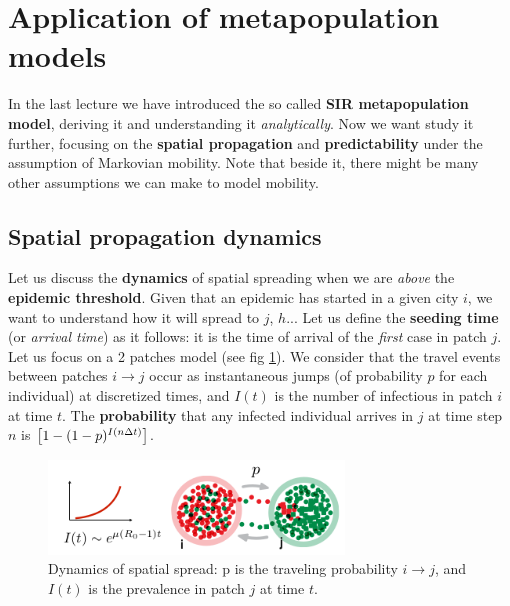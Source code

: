 \documentclass[../main/main.tex]{subfiles}
\begin{document}

\section{Application of metapopulation models}

In the last lecture we have introduced the so called \textbf{SIR metapopulation model}, deriving it and understanding it \textit{analytically}. Now we want study it further, focusing on the \textbf{spatial propagation} and \textbf{predictability} under the assumption of Markovian mobility. Note that beside it, there might be many other assumptions we can make to model mobility.

\subsection{Spatial propagation dynamics}

Let us discuss the \textbf{dynamics} of spatial spreading when we are \textit{above} the \textbf{epidemic threshold}. Given that an epidemic has started in a given city $i$, we want to understand how it will spread to $j$, $h$... Let us define the \textbf{seeding time} (or \textit{arrival time}) as it follows: it is the time of arrival of the \textit{first} case in patch $j$. Let us focus on a 2 patches model (see fig \ref{fig:14_01}). We consider that the travel events between patches $i \to j$ occur as instantaneous jumps (of probability $p$ for each individual) at discretized times, and $I(t)$ is the number of infectious in patch $i$ at time $t$. The \textbf{probability} that any infected individual arrives in $j$ at time step $n$ is \( \qty[1-(1-p)^{I(n \Delta t)}] \).

\begin{figure}[h!]
\centering
\includegraphics[width=0.7\textwidth]{../lessons/image/15/image01.png}
\caption{\label{fig:14_01} Dynamics of spatial spread: p is the traveling probability $i \to j$, and $I(t)$ is the prevalence in patch $j$ at time $t$.}
\end{figure}
\end{document}
